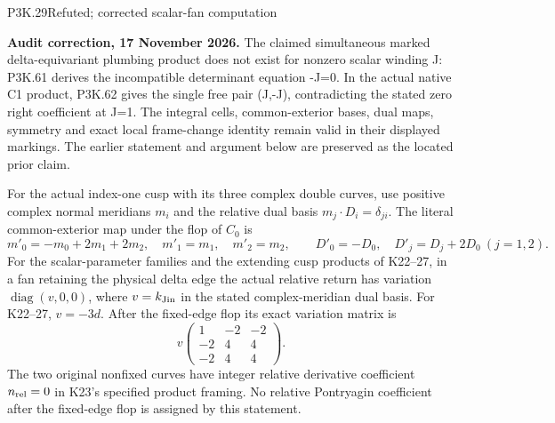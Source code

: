 \begin{statement}{P3K.29}{Refuted; corrected scalar-fan computation}
\par\noindent\textbf{Audit correction, 17 November 2026.} The claimed simultaneous marked delta-equivariant plumbing product does not exist for nonzero scalar winding J: P3K.61 derives the incompatible determinant equation -J=0. In the actual native C1 product, P3K.62 gives the single free pair (J,-J), contradicting the stated zero right coefficient at J=1. The integral cells, common-exterior bases, dual maps, symmetry and exact local frame-change identity remain valid in their displayed markings. The earlier statement and argument below are preserved as the located prior claim.
\medskip

For the actual index-one cusp with its three complex double curves,
use positive complex normal meridians \(m_i\) and the relative dual
basis \(m_j\cdot D_i=\delta_{ji}\). The literal common-exterior map
under the flop of \(C_0\) is
\[
 m'_0=-m_0+2m_1+2m_2,\quad m'_1=m_1,\quad m'_2=m_2,
 \qquad D'_0=-D_0,\quad D'_j=D_j+2D_0\ (j=1,2).
\]
For the scalar-parameter families and the extending cusp products
of K22--27, in a fan retaining the physical delta edge the actual
relative return has variation \(\operatorname{diag}(v,0,0)\), where
\(v=k_{\rm Jin}\) in the stated complex-meridian dual basis.
For K22--27, \(v=-3d\). After the fixed-edge flop its exact
variation matrix is
\[
 v\begin{pmatrix}1&-2&-2\\-2&4&4\\-2&4&4\end{pmatrix}.
\]
The two original nonfixed curves have integer relative derivative
coefficient \(n_{\rm rel}=0\) in K23's specified product framing.
No relative Pontryagin coefficient after the fixed-edge flop is
assigned by this statement.
\end{statement}

